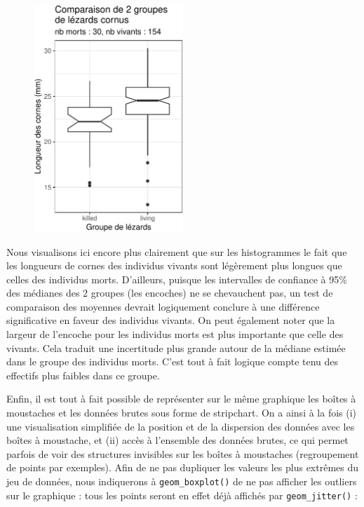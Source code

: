\documentclass[
  a4paper,
  DIV=11,
  numbers=noendperiod,
  oneside]{scrreprt}
\begin{document}
\begin{figure}[H]

{\centering \includegraphics[width=0.5\textwidth,height=\textheight]{03-TwoSampleTests_files/figure-pdf/unnamed-chunk-14-1.pdf}

}

\end{figure}

Nous visualisons ici encore plus clairement que sur les histogrammes le
fait que les longueurs de cornes des individus vivants sont légèrement
plus longues que celles des individus morts. D'ailleurs, puisque les
intervalles de confiance à 95\% des médianes des 2 groupes (les
encoches) ne se chevauchent pas, un test de comparaison des moyennes
devrait logiquement conclure à une différence significative en faveur
des individus vivants. On peut également noter que la largeur de
l'encoche pour les individus morts est plus importante que celle des
vivants. Cela traduit une incertitude plus grande autour de la médiane
estimée dans le groupe des individus morts. C'est tout à fait logique
compte tenu des effectifs plus faibles dans ce groupe.

Enfin, il est tout à fait possible de représenter sur le même graphique
les boîtes à moustaches et les données brutes sous forme de stripchart.
On a ainsi à la fois (i) une visualisation simplifiée de la position et
de la dispersion des données avec les boîtes à moustache, et (ii) accès
à l'ensemble des données brutes, ce qui permet parfois de voir des
structures invisibles sur les boîtes à moustaches (regroupement de
points par exemples). Afin de ne pas dupliquer les valeurs les plus
extrêmes du jeu de données, nous indiquerons à \texttt{geom\_boxplot()}
de ne pas afficher les outliers sur le graphique : tous les points
seront en effet déjà affichés par \texttt{geom\_jitter()} :
\end{document}

